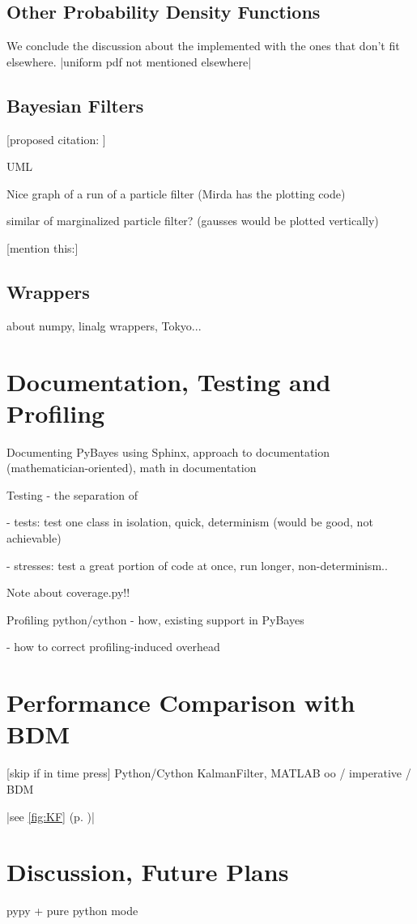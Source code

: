 \subsection{Other Probability Density Functions}

We conclude the discussion about the implemented {\pdfs} with the ones that don't fit elsewhere.
|uniform pdf not mentioned elsewhere|

\subsection{Bayesian Filters}

[proposed citation: \cite{Smi:05}]

UML

Nice graph of a run of a particle filter (Mirda has the plotting code)

similar of marginalized particle filter? (gausses would be plotted vertically)

[mention this:\cite{Smi:10}]

\subsection{Wrappers} \label{sec:PyBayesWrappers}

about numpy, linalg wrappers, Tokyo...

\section{Documentation, Testing and Profiling} \label{sec:PyBayesDocsTests}

Documenting PyBayes using Sphinx, approach to documentation (mathematician-oriented), math in documentation

Testing - the separation of

- tests: test one class in isolation, quick, determinism (would be good, not achievable)

- stresses: test a great portion of code at once, run longer, non-determinism..

Note about coverage.py!!

Profiling python/cython - how, existing support in PyBayes

- how to correct profiling-induced overhead

\section{Performance Comparison with BDM} \label{sec:PyBayesPerformance}

[skip if in time press]
Python/Cython KalmanFilter, MATLAB oo / imperative / BDM

|see \autoref{fig:KF} (p. \pageref{fig:KF})|

\section{Discussion, Future Plans}

pypy + pure python mode
